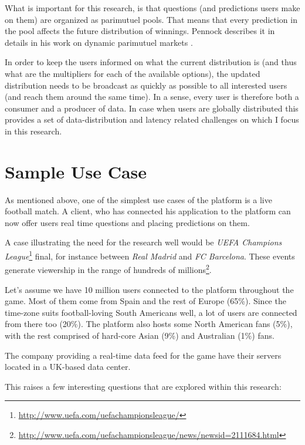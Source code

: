 \documentclass{uvamscse}
\begin{document}
What is important for this research, is that questions (and predictions users make on them) are organized as parimutuel pools. That means that every prediction in the pool affects the future distribution of winnings. Pennock describes it in details in his work on dynamic parimutuel markets \cite{Pari}.

In order to keep the users informed on what the current distribution is (and thus what are the multipliers for each of the available options), the updated distribution needs to be broadcast as quickly as possible to all interested users (and reach them around the same time). In a sense, every user is therefore both a consumer and a producer of data. In case when users are globally distributed this provides a set of data-distribution and latency related challenges on which I focus in this research.

\section{Sample Use Case}

As mentioned above, one of the simplest use cases of the platform is a live football match. A client, who has connected his application to the platform can now offer users real time questions and placing predictions on them.

A case illustrating the need for the research well would be \textit{UEFA Champions League}\footnote{\url{http://www.uefa.com/uefachampionsleague/}} final, for instance between \textit{Real Madrid} and \textit{FC Barcelona}. These events generate viewership in the range of hundreds of millions\footnote{\url{http://www.uefa.com/uefachampionsleague/news/newsid=2111684.html}}.

Let's assume we have 10 million users connected to the platform throughout the game. Most of them come from Spain and the rest of Europe (65\%). Since the time-zone suits football-loving South Americans well, a lot of users are connected from there too (20\%). The platform also hosts some North American fans (5\%), with the rest comprised of hard-core Asian (9\%) and Australian (1\%) fans.

The company providing a real-time data feed for the game have their servers located in a UK-based data center.

This raises a few interesting questions that are explored within this research:
\end{document}
